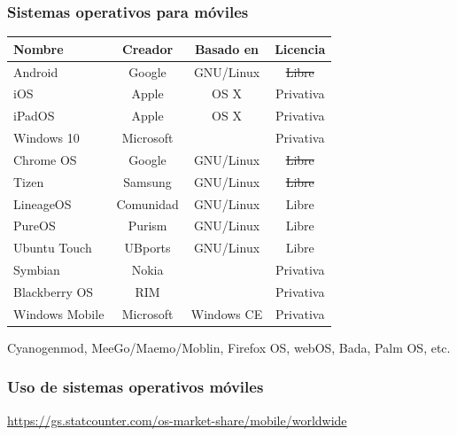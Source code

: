 \documentclass{beamer}
\begin{document}
\begin{frame} \frametitle{Sistemas operativos para móviles}
  \begin{center}
    \begin{tabular}[center]{|l|ccc|}
      \hline
      Nombre & Creador & Basado en& Licencia\\
      \hline
      Android&Google&GNU/Linux&\sout{Libre}\\
      iOS&Apple&OS X&Privativa\\
      iPadOS&Apple&OS X&Privativa\\
      Windows 10&Microsoft&&Privativa\\
      Chrome OS&Google&GNU/Linux&\sout{Libre}\\
      Tizen&Samsung&GNU/Linux&\sout{Libre}\\
      LineageOS&Comunidad&GNU/Linux&Libre\\
      PureOS&Purism&GNU/Linux&Libre\\
      Ubuntu Touch&UBports&GNU/Linux&Libre\\
      {\color{red}Symbian}&Nokia&&Privativa\\
      {\color{red}Blackberry OS}&RIM&&Privativa\\
      {\color{red}Windows Mobile}&Microsoft&Windows CE&Privativa\\
      \hline
    \end{tabular}
  \end{center}

    Cyanogenmod, MeeGo/Maemo/Moblin, Firefox OS, webOS, Bada, Palm OS, etc.   
\end{frame}

\begin{frame} \frametitle{Uso de sistemas operativos móviles}
  \begin{center}
    \url{https://gs.statcounter.com/os-market-share/mobile/worldwide}
\end{center}
\end{frame}
\end{document}

